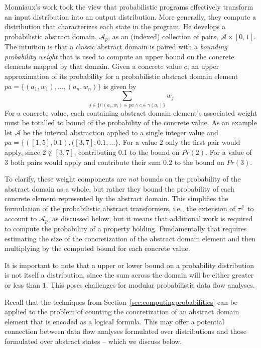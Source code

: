Monniaux's work took the view that probabilistic programs 
effectively transform an input distribution into an output
distribution.  More generally, they compute a distribution that
characterizes each state in the program.   
He develops a probabilistic abstract domain, $\mathcal{A}_p$, 
as an (indexed) collection of pairs, $\mathcal{A} \times [0,1]$.
The intuition is that a classic abstract domain is paired
with a \textit{bounding probability weight} that is used
to compute an upper bound on the concrete elements mapped
by that domain.
Given a concrete value $c$, 
an upper approximation of its probability 
for a probabilistic abstract domain
element $pa = \{(a_1,w_1), ..., (a_n,w_n)\}$
is given by
\[
\sum_{j \in \{ i \vert (a_i,w_i) \in pa \wedge c \in \gamma(a_i)\}} w_j
\]
For a concrete value, each containing abstract
domain element's associated weight must be totalled
to bound of the probability of the concrete value.
As an example let $\mathcal{A}$ be the interval abstraction
applied to a single integer value
and $pa = \{([1,5],0.1),([3,7],0.1,...\}$.  
For a value $2$ only the first pair would apply, since
$2 \not\in [3,7]$, contributing $0.1$ to the bound on $Pr(2)$.
For a value of $3$ both pairs would apply and contribute
their sum $0.2$ to the bound on $Pr(3)$.

To clarify, these weight components are \textit{not} bounds on the probability
of the abstract domain as a whole, but rather they bound the probability
of each concrete element represented by the abstract domain.
This simplifies the formulation of the probabilistic abstract
transformers, i.e., the extension of $\tau^\#$ to account to 
$\mathcal{A}_p$, as discussed below, but it means that additional
work is required to compute the probability of a property holding.
Fundamentally that requires estimating the size of the concretization
of the abstract domain element and then multiplying by the computed bound for
each concrete value.  

It is important to note that a upper or lower
bound on a probability distribution
is not itself a distribution, since the sum across the domain
will be either greater or less than $1$.
This poses challenges for modular probabilistic data flow analyses.

Recall that the techniques from 
Section~\ref{sec:computingprobabilities} can be applied to
the problem of counting the concretization of an abstract domain element 
that is encoded as a logical formula.  This may offer a potential
connection between data flow analyses formulated over distributions
and those formulated over abstract states -- which we discuss below.

